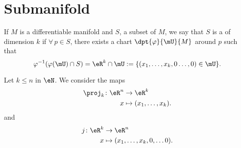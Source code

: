 \section{Submanifold}

\begin{definition}      \label{DEFooLQHWooMOTgzq}
    If $M$ is a differentiable manifold and $S$, a subset of $M$, we say that $S$ is a  of dimension $k$ if $\forall\,p\in S$, there exists a chart $\dpt{\varphi}{\mU}{M}$ around $p$ such that
    \begin{equation}        \label{EQooLWQRooQJCQbA}
       \varphi^{-1}(\varphi(\mU)\cap S)=\eR^k\cap\mU:=\{(x_1,\ldots,x_k,0\ldots,0)\in\mU\}.
    \end{equation}
\end{definition}

Let \( k\leq n\) in \( \eN\). We consider the maps
\begin{equation}
    \begin{aligned}
        \proj_k\colon \eR^n&\to \eR^k \\
        x&\mapsto (x_1,\ldots, x_k). 
    \end{aligned}
\end{equation}
and
\begin{equation}
    \begin{aligned}
        j\colon \eR^k&\to \eR^n \\
        x&\mapsto (x_1,\ldots, x_k,0,\ldots 0). 
    \end{aligned}
\end{equation}

